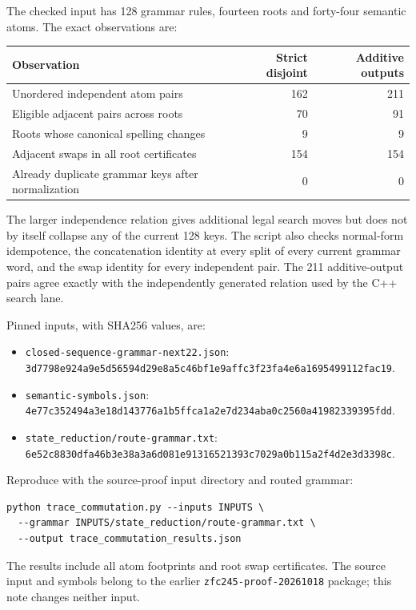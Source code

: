 The checked input has 128 grammar rules, fourteen roots and forty-four
semantic atoms. The exact observations are:
\begin{center}
\begin{tabular}{lrr}
\toprule
Observation & Strict disjoint & Additive outputs\\
\midrule
Unordered independent atom pairs &162&211\\
Eligible adjacent pairs across roots &70&91\\
Roots whose canonical spelling changes &9&9\\
Adjacent swaps in all root certificates &154&154\\
Already duplicate grammar keys after normalization &0&0\\
\bottomrule
\end{tabular}
\end{center}
The larger independence relation gives additional legal search moves but
does not by itself collapse any of the current 128 keys. The script also
checks normal-form idempotence, the concatenation identity at every split
of every current grammar word, and the swap identity for every independent
pair. The 211 additive-output pairs agree exactly with the independently
generated relation used by the C++ search lane.

Pinned inputs, with SHA256 values, are:
\begin{itemize}
\item \texttt{closed-sequence-grammar-next22.json}:\\
\texttt{3d7798e924a9e5d56594d29e8a5c46bf1e9affc3f23fa4e6a1695499112fac19}.
\item \texttt{semantic-symbols.json}:\\
\texttt{4e77c352494a3e18d143776a1b5ffca1a2e7d234aba0c2560a41982339395fdd}.
\item \texttt{state\_reduction/route-grammar.txt}:\\
\texttt{6e52c8830dfa46b3e38a3a6d081e91316521393c7029a0b115a2f4d2e3d3398c}.
\end{itemize}
Reproduce with the source-proof input directory and routed grammar:
\begin{verbatim}
python trace_commutation.py --inputs INPUTS \
  --grammar INPUTS/state_reduction/route-grammar.txt \
  --output trace_commutation_results.json
\end{verbatim}
The results include all atom footprints and root swap certificates.
The source input and symbols belong to the earlier
\texttt{zfc245-proof-20261018} package; this note changes neither input.
